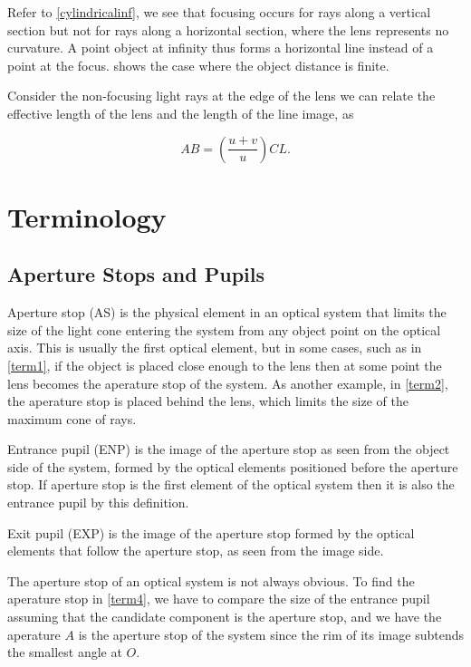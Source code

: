 \documentclass[english,a4paper,12pt]{report}
\begin{document}
Refer to \cref{cylindricalinf}, we see that focusing occurs for rays along a vertical section but not for rays along a horizontal section, where the lens represents no curvature. A point object at infinity thus forms a horizontal line instead of a point at the focus.  shows the case where the object distance is finite.

Consider the non-focusing light rays at the edge of the lens we can relate the effective length of the lens and the length of the line image, as

\begin{equation}
    AB = \left( \frac{u+v}{u}  \right) CL.
\end{equation}



\section{Terminology}

\subsection{Aperture Stops and Pupils}

Aperture stop (AS) is the physical element in an optical system that limits the size of the light cone entering the system from any object point on the optical axis. This is usually the first optical element, but in some cases, such as in \cref{term1}, if the object is placed close enough to the lens then at some point the lens becomes the aperature stop of the system. As another example, in \cref{term2}, the aperature stop is placed behind the lens, which limits the size of the maximum cone of rays. 

Entrance pupil (ENP) is the image of the aperture stop as seen from the object side of the system, formed by the optical elements positioned before the aperture stop. If aperture stop is the first element of the optical system then it is also the entrance pupil by this definition. 

Exit pupil (EXP) is the image of the aperture stop formed by the optical elements that follow the aperture stop, as seen from the image side.



The aperture stop of an optical system is not always obvious. To find the aperature stop in \cref{term4}, we have to compare the size of the entrance pupil assuming that the candidate component is the aperture stop, and we have the aperature \(A\) is the aperture stop of the system since the rim of its image subtends the smallest angle at \(O\). 
\end{document}
